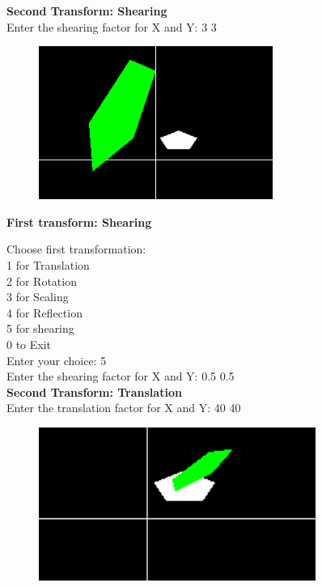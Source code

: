 \documentclass[9pt,letterpaper]{article}
\begin{document}
\newpage

\textbf{\large{Second Transform: Shearing}}\\
Enter the shearing factor for X and Y: 3 3 \\

\begin{figure}[h]
    \centering
    \includegraphics[height=5cm]{CompositeTransformations/Outputs/ReflectShear.png}
\end{figure}

\newpage

\textbf{\Large{First transform: Shearing}}

Choose first transformation: \\
1 for Translation\\
2 for Rotation\\
3 for Scaling\\
4 for Reflection\\
5 for shearing\\
0 to Exit\\
Enter your choice: 5\\
Enter the shearing factor for X and Y: 0.5 0.5\\


\textbf{\large{Second Transform: Translation}}\\
Enter the translation factor for X and Y: 40 40 \\

\begin{figure}[h]
    \centering
    \includegraphics[height=5cm]{CompositeTransformations/Outputs/ShearTranslate.png}
\end{figure}
\end{document}
